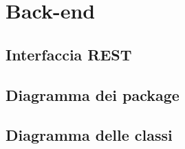 \section{Back-end}


\subsection{Interfaccia REST}


\subsection{Diagramma dei package}

\subsection{Diagramma delle classi}